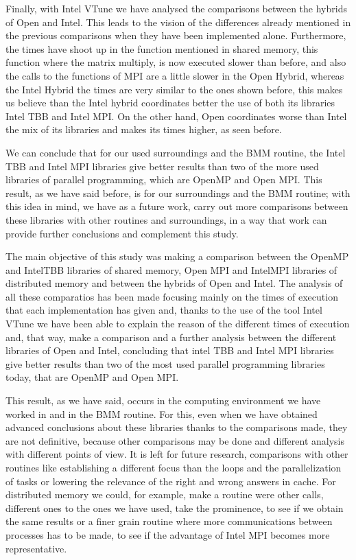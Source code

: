 \documentclass[a4paper,12pt]{article}
\begin{document}
Finally, with Intel VTune we have analysed the comparisons between the hybrids of Open and Intel. This leads to the vision of the differences already mentioned  in the previous comparisons when they have been implemented alone. Furthermore, the times have shoot up in the function mentioned in shared memory, this function where the matrix multiply, is now executed slower than before, and also the calls to the functions of MPI are a little slower in the Open Hybrid, whereas the Intel Hybrid the times are very similar to the ones shown before, this makes us believe than the Intel hybrid coordinates better the use of both its libraries Intel TBB and Intel MPI. On the other hand, Open coordinates worse than Intel the mix of its libraries and makes its times higher, as seen before.

We can conclude that for our used surroundings and the BMM routine, the Intel TBB and Intel MPI libraries give better results than two of the more used libraries of parallel programming, which are OpenMP and Open MPI. This result, as we have said before, is for our surroundings and the BMM routine; with this idea in mind, we have as a future work, carry out more comparisons between these libraries with other routines and surroundings, in a way that work can provide further conclusions and complement this study.

The main objective of this study was making a comparison between the OpenMP and IntelTBB libraries of shared memory, Open MPI and IntelMPI libraries of distributed memory and between the hybrids of Open and Intel. The analysis of all these comparatios has been made focusing mainly on the times of execution that each implementation has given and, thanks to the use of the tool Intel VTune we have been able to explain the reason of the different times of execution and, that way, make a comparison and a further analysis between the different libraries of Open and Intel, concluding that intel TBB and Intel MPI libraries give better results than two of the most used parallel programming libraries today, that are OpenMP and Open MPI.

This result, as we have said, occurs in the computing environment we have worked in and in the BMM routine. For this, even when we have obtained advanced conclusions about these libraries thanks to the comparisons made, they are not definitive, because other comparisons may be done and different analysis with different points of view. It is left for future research, comparisons with other routines like establishing a different focus than the loops and the parallelization of tasks or lowering the relevance of the right and wrong answers in cache. For distributed memory we could, for example, make a routine were other calls, different ones to the ones we have used, take the prominence, to see if we obtain the same results or a finer grain routine where more communications between processes has to be made, to see if the advantage of Intel MPI becomes more representative.
\end{document}
